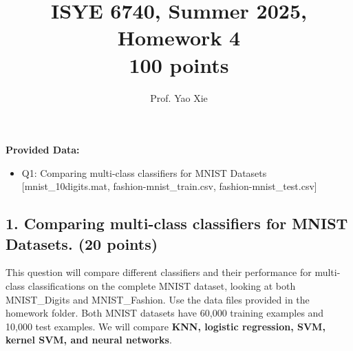 \documentclass[12pt]{article}
\begin{document}
\title{ISYE 6740, Summer 2025, Homework 4\\{\small 100 points}}
\author{Prof. Yao Xie}
\date{}
\maketitle

\textbf{Provided Data:}
\begin{itemize}
    \item Q1: Comparing multi-class classifiers for MNIST Datasets [mnist\_10digits.mat, fashion-mnist\_train.csv, fashion-mnist\_test.csv]
\end{itemize}

\subsection*{1. Comparing multi-class classifiers for MNIST Datasets. (20 points)}

This question will compare different classifiers and their performance for multi-class classifications on the complete MNIST dataset, looking at both MNIST\_Digits and MNIST\_Fashion. Use the data files provided in the homework folder. Both MNIST datasets have 60,000 training examples and 10,000 test examples. We will compare {\bf KNN, logistic regression, SVM, kernel SVM, and neural networks}. 
\end{document}
